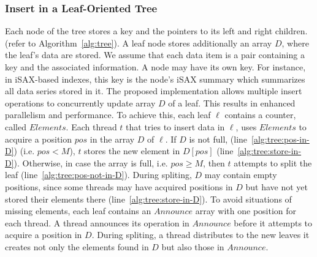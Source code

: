    \subsubsection{Insert in a Leaf-Oriented Tree}
    \label{sec:leaf-oriented}
    Each node of the tree stores a key and the pointers
    to its left and right children.  (refer to Algorithm~\ref{alg:tree}).
    A leaf node stores additionally an array $D$, where the leaf's data are stored. 
    We assume that each data item is a pair containing a key and the associated information.
    A node may have its own key. For instance, in iSAX-based indexes, this key is the node's
    iSAX summary which summarizes all data series stored in it.
    The proposed implementation allows multiple insert operations to concurrently update array
    $D$ of a leaf. This results in enhanced parallelism and performance. 
    To achieve this, each leaf $\ell$ contains a counter, called $\mathit{Elements}$.
    Each thread $\mathit{t}$ that tries to insert data in $\ell$, uses
    $\mathit{Elements}$ to acquire a position $\mathit{pos}$ in the array $D$ of $\ell$.
    If $D$ is not full, (line~\ref{alg:tree:pos-in-D}) (i.e. $\mathit{pos} < M$), 
    $\mathit{t}$ stores the new element in $D[\mathit{pos}]$ (line~\ref{alg:tree:store-in-D}).
    Otherwise, in case the array is full, i.e. $\mathit{pos \geq M}$, then 
    $\mathit{t}$ attempts to split the leaf (line~\ref{alg:tree:pos-not-in-D}). 
    During spliting, $D$ may contain empty positions, since some
    threads may have acquired positions in $D$ but have not yet stored their
    elements there (line~\ref{alg:tree:store-in-D}).
    To avoid situations of missing elements, each leaf contains an $\mathit{Announce}$ array 
    with one position for each thread. A thread announces its operation
    in $\mathit{Announce}$ before it attempts to acquire a position in $D$.
    During spliting, a thread distributes to the new leaves it creates not only the
    elements found in $D$ but also those in $\mathit{Announce}$.

